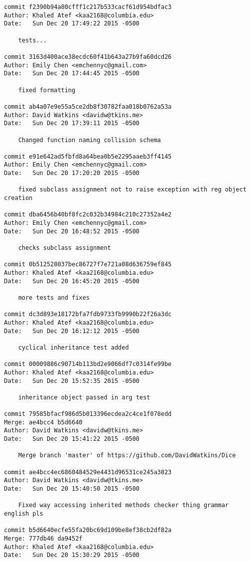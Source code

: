 \begin{verbatim}
commit f2390b94a80cfff1c217b533cacf61d954bdfac3
Author: Khaled Atef <kaa2168@columbia.edu>
Date:   Sun Dec 20 17:49:22 2015 -0500

    tests...

commit 3163d400ace38ecdc60f41b643a27b9fa60dcd26
Author: Emily Chen <emchennyc@gmail.com>
Date:   Sun Dec 20 17:44:45 2015 -0500

    fixed formatting

commit ab4a07e9e55a5ce2db8f30782faa018b0762a53a
Author: David Watkins <davidw@tkins.me>
Date:   Sun Dec 20 17:39:11 2015 -0500

    Changed function naming collision schema

commit e91e642ad5fbfd8a64bea0b5e2295aaeb3ff4145
Author: Emily Chen <emchennyc@gmail.com>
Date:   Sun Dec 20 17:20:20 2015 -0500

    fixed subclass assignment not to raise exception with reg object creation

commit dba6456b40bf8fc2c032b34984c210c27352a4e2
Author: Emily Chen <emchennyc@gmail.com>
Date:   Sun Dec 20 16:48:52 2015 -0500

    checks subclass assignment

commit 0b512528037bec86727f7e721a08d636759ef845
Author: Khaled Atef <kaa2168@columbia.edu>
Date:   Sun Dec 20 16:45:20 2015 -0500

    more tests and fixes

commit dc3d893e18172bfa7fdb9733fb9990b22f26a3dc
Author: Khaled Atef <kaa2168@columbia.edu>
Date:   Sun Dec 20 16:12:12 2015 -0500

    cyclical inheritance test added

commit 00009886c90714b113bd2e9066df7c0314fe99be
Author: Khaled Atef <kaa2168@columbia.edu>
Date:   Sun Dec 20 15:52:35 2015 -0500

    inheritance object passed in arg test

commit 79585bfacf986d5b013396ecdea2c4ce1f078edd
Merge: ae4bcc4 b5d6640
Author: David Watkins <davidw@tkins.me>
Date:   Sun Dec 20 15:41:22 2015 -0500

    Merge branch 'master' of https://github.com/DavidWatkins/Dice

commit ae4bcc4ec6860484529e4431d96531ce245a3823
Author: David Watkins <davidw@tkins.me>
Date:   Sun Dec 20 15:40:50 2015 -0500

    Fixed way accessing inherited methods checker thing grammar english pls

commit b5d6640ecfe55fa20bc69d109be8ef38cb2df82a
Merge: 777db46 da9452f
Author: Khaled Atef <kaa2168@columbia.edu>
Date:   Sun Dec 20 15:30:29 2015 -0500


\end{verbatim}
